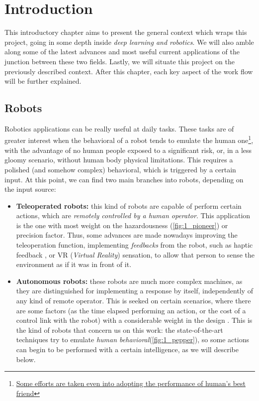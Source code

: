 \chapter{Introduction}

This introductory chapter aims to present the general context which wraps this project, going in some depth inside \textit{deep learning and robotics}. We will also amble along some of the latest advances and most useful current applications of the junction between these two fields. Lastly, we will situate this project on the previously described context. After this chapter, each key aspect of the work flow will be further explained.\\

\section{Robots}

Robotics applications can be really useful at daily tasks. These tasks are of greater interest when the behavioral of a robot tends to emulate the human one\footnote{\href{https://www.engadget.com/2018/01/08/new-sony-aibo-first-impressions/}{Some efforts are taken even into adopting the performance of human's best friend}}, with the advantage of no human people exposed to a significant risk, or, in a less gloomy scenario, without human body physical limitations. This requires a polished (and somehow complex) behavioral, which is triggered by a certain input. At this point, we can find two main branches into robots, depending on the input source:
\begin{itemize}
	\item \textbf{Teleoperated robots:} this kind of robots are capable of perform certain actions, which are \textit{remotely controlled by a human operator}. This application is the one with most weight on the hazardousness (\autoref{fig:1_pioneer}) \cite{chernobyl-robot} or precision \cite{teleop-surgery} factor. Thus, some advances are made nowadays improving the teleoperation function, implementing \emph{feedbacks} from the robot, such as haptic feedback \cite{teleop-haptic}, or VR (\emph{Virtual Reality}) sensation, to allow that person to sense the environment as if it was in front of it.	
	
	\item \textbf{Autonomous robots:} these robots are much more complex machines, as they are distinguished for implementing a response by itself, independently of any kind of remote operator. This is seeked on certain scenarios, where there are some factors (as the time elapsed performing an action, or the cost of a control link with the robot) with a considerable weight in the design \cite{ai-space}. This is the kind of robots that concern us on this work: the state-of-the-art techniques try to emulate \emph{human behavioral}(\autoref{fig:1_pepper}), so some actions can begin to be performed with a certain intelligence, as we will describe below.
\end{itemize}



